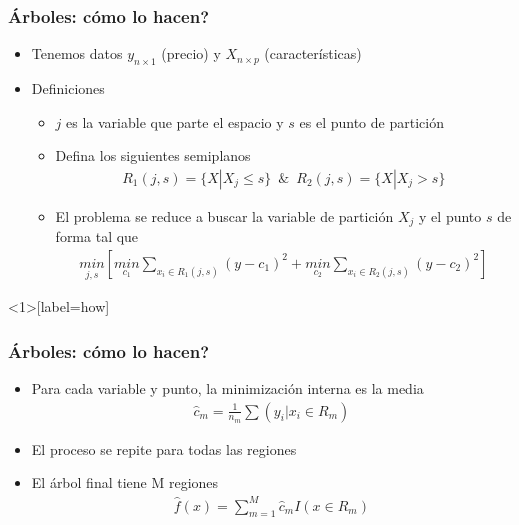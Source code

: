 \documentclass[
  shownotes,
  xcolor={svgnames},
  hyperref={colorlinks,citecolor=DarkBlue,linkcolor=DarkRed,urlcolor=DarkBlue}
  , aspectratio=169]{beamer}
\begin{document}
\begin{frame}[fragile]
\frametitle{Árboles: cómo lo hacen?}

\begin{itemize}
\item Tenemos datos $y_{n\times 1}$ (precio) y $X_{n\times p}$ (características)
\item Definiciones
\begin{itemize}
\item $j$ es la variable que parte el espacio y  $s$ es el punto de partición
\item Defina los siguientes semiplanos
\begin{align}
R_1(j,s)=\{X|X_j\leq s\} \,\,\, \& \,\,\, R_2(j,s)=\{X|X_j > s\}
\end{align}
\item El problema se reduce a buscar la variable de partición $X_j$ y el punto $s$ de forma tal que 
\begin{align}
\underset{j,s}{min} \left[ \underset{c_1}{min}\sum_{x_i\in R_1(j,s)}(y-c_1)^2+ \underset{c_2}{min}\sum_{x_i\in R_2(j,s)}(y-c_2)^2\right]
\end{align}
\end{itemize}
\end{itemize}
\end{frame}
\begin{frame}<1>[label=how]
\frametitle{Árboles: cómo lo hacen?}

\begin{itemize}
\item Para cada variable y punto, la minimización interna es la media
\begin{align}
 \hat{c}_m =\frac{1}{n_m} \sum(y_i|x_i \in R_m)
\end{align}
\item El proceso se repite para todas las regiones
\pause
\item El árbol final tiene M regiones
\begin{align}
\hat{f}(x) = \sum_{m=1}^M \hat{c}_m I(x \in R_m)
\end{align}

\end{itemize}

\end{frame}

\end{document}
